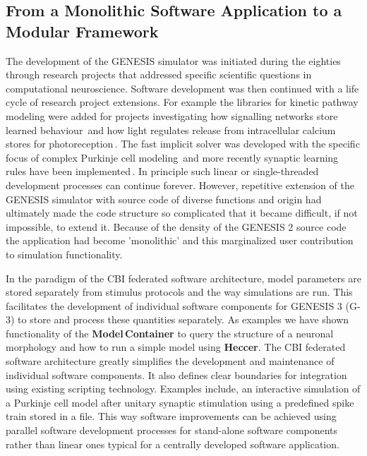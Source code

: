 \documentclass[12pt]{article}
\begin{document}
\subsection{From a Monolithic Software Application to a Modular
  Framework}
\label{sec:from-monol-softw}
The development of the GENESIS simulator was initiated during the
eighties through research projects that addressed specific scientific
questions in computational neuroscience.  Software development was
then continued with a life cycle of research project extensions.  For
example the libraries for kinetic pathway modeling were added for
projects investigating how signalling networks store learned
behaviour\,\cite{bhalla99:_emerg} and how light regulates release from
intracellular calcium stores for
photoreception\,\cite{blackwell00:_eviden_distin_light_induc_calcium}.
The fast implicit solver was developed with the specific focus of
complex Purkinje cell modeling\,\cite{deschutter94:_purkin_i,
  deschutter94:_purkin_ii} and more recently synaptic learning rules
have been
implemented\,\cite{guenay08:_chann_densit_distr_explain_spikin}.  In
principle such linear or single-threaded development processes can
continue forever.  However, repetitive extension of the GENESIS
simulator with source code of diverse functions and origin had
ultimately made the code structure so complicated that it became
difficult, if not impossible, to extend it.  Because of the density of
the GENESIS 2 source code the application had become 'monolithic' and
this marginalized user contribution to simulation functionality.

In the paradigm of the CBI federated software architecture, model
parameters are stored separately from stimulus protocols and the way
simulations are run.  This facilitates the development of individual
software components for GENESIS 3 (G-3) to store and process these
quantities separately.  As examples we have shown functionality of the
{\bf Model\,Container} to query the structure of a neuronal morphology
and how to run a simple model using {\bf Heccer}.  The CBI federated
software architecture greatly simplifies the development and
maintenance of individual software components.  It also defines clear
boundaries for integration using existing scripting technology.
Examples include, an interactive simulation of a Purkinje cell model
after unitary synaptic stimulation using a predefined spike train
stored in a file.  This way software improvements can be achieved
using parallel software development processes for stand-alone software
components rather than linear ones typical for a centrally developed
software application.
\end{document}
